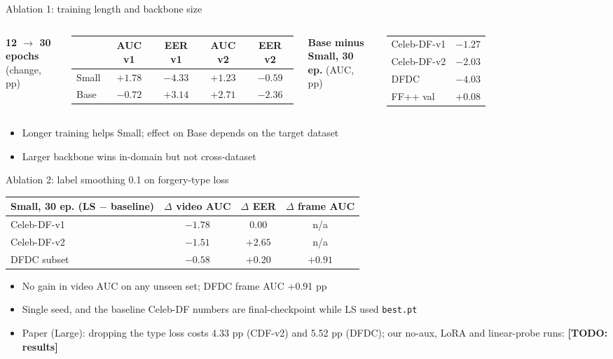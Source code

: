 \documentclass[aspectratio=169,10pt]{beamer}
\newcommand{\todo}[1]{\textbf{[TODO: #1]}}
\begin{document}
\begin{frame}{Ablation 1: training length and backbone size}
\footnotesize
\begin{columns}[T]
\centering
\textbf{12 $\to$ 30 epochs} (change, pp)\\[3pt]
\begin{tabular}{|l||c|c|c|c|}
\hline
 & AUC v1 & EER v1 & AUC v2 & EER v2\\\hline
Small & $+1.78$ & $-4.33$ & $+1.23$ & $-0.59$\\
Base & $-0.72$ & $+3.14$ & $+2.71$ & $-2.36$\\\hline
\end{tabular}
\centering
\textbf{Base minus Small, 30 ep.} (AUC, pp)\\[3pt]
\begin{tabular}{|l||c|}
\hline
Celeb-DF-v1 & $-1.27$\\
Celeb-DF-v2 & $-2.03$\\
DFDC & $-4.03$\\
FF++ val & $+0.08$\\\hline
\end{tabular}
\end{columns}
\vspace{6pt}
\normalsize
\begin{itemize}
\item Longer training helps Small; effect on Base depends on the target dataset
\item Larger backbone wins in-domain but not cross-dataset
\end{itemize}
\end{frame}

\begin{frame}{Ablation 2: label smoothing 0.1 on forgery-type loss}
\footnotesize
\centering
\begin{tabular}{|l||c|c|c|}
\hline
Small, 30 ep. (LS $-$ baseline) & $\Delta$ video AUC & $\Delta$ EER & $\Delta$ frame AUC\\\hline
Celeb-DF-v1 & $-1.78$ & $0.00$ & n/a\\
Celeb-DF-v2 & $-1.51$ & $+2.65$ & n/a\\
DFDC subset & $-0.58$ & $+0.20$ & $+0.91$\\\hline
\end{tabular}
\vspace{6pt}
\normalsize
\begin{itemize}
\item No gain in video AUC on any unseen set; DFDC frame AUC +0.91 pp
\item Single seed, and the baseline Celeb-DF numbers are final-checkpoint while LS used \texttt{best.pt}
\item Paper (Large): dropping the type loss costs 4.33 pp (CDF-v2) and 5.52 pp (DFDC); our no-aux, LoRA and linear-probe runs: \todo{results}
\end{itemize}
\end{frame}
\end{document}
